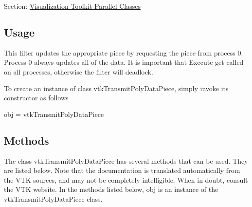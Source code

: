 Section\-: \hyperlink{sec_vtkparallel}{Visualization Toolkit Parallel Classes} \hypertarget{vtkwidgets_vtkxyplotwidget_Usage}{}\subsection{Usage}\label{vtkwidgets_vtkxyplotwidget_Usage}
This filter updates the appropriate piece by requesting the piece from process 0. Process 0 always updates all of the data. It is important that Execute get called on all processes, otherwise the filter will deadlock.

To create an instance of class vtk\-Transmit\-Poly\-Data\-Piece, simply invoke its constructor as follows \begin{DoxyVerb}  obj = vtkTransmitPolyDataPiece
\end{DoxyVerb}
 \hypertarget{vtkwidgets_vtkxyplotwidget_Methods}{}\subsection{Methods}\label{vtkwidgets_vtkxyplotwidget_Methods}
The class vtk\-Transmit\-Poly\-Data\-Piece has several methods that can be used. They are listed below. Note that the documentation is translated automatically from the V\-T\-K sources, and may not be completely intelligible. When in doubt, consult the V\-T\-K website. In the methods listed below, {\ttfamily obj} is an instance of the vtk\-Transmit\-Poly\-Data\-Piece class. 
